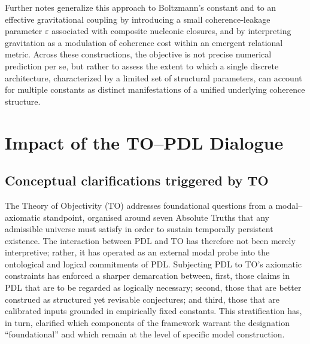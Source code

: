 \documentclass[11pt,a4paper]{article}
\begin{document}
Further notes generalize this approach to Boltzmann’s constant and to an effective gravitational coupling by introducing a small coherence‑leakage parameter $\varepsilon$ associated with composite nucleonic closures, and by interpreting gravitation as a modulation of coherence cost within an emergent relational metric.\cite{Laubscher2026FullPDL,Laubscher2026TopologicalReformulation,Laubscher2026Exponent18} Across these constructions, the objective is not precise numerical prediction per se, but rather to assess the extent to which a single discrete architecture, characterized by a limited set of structural parameters, can account for multiple constants as distinct manifestations of a unified underlying coherence structure.\cite{Laubscher2026FullPDL}

\section{Impact of the TO–PDL Dialogue}

\subsection{Conceptual clarifications triggered by TO}

The Theory of Objectivity (TO) addresses foundational questions from a modal–axiomatic standpoint, organised around seven Absolute Truths that any admissible universe must satisfy in order to sustain temporally persistent existence.\cite{Laubscher2026DialogueTO} The interaction between PDL and TO has therefore not been merely interpretive; rather, it has operated as an external modal probe into the ontological and logical commitments of PDL.\cite{Laubscher2026DialogueTO} Subjecting PDL to TO’s axiomatic constraints has enforced a sharper demarcation between, first, those claims in PDL that are to be regarded as logically necessary; second, those that are better construed as structured yet revisable conjectures; and third, those that are calibrated inputs grounded in empirically fixed constants.\cite{Laubscher2026IntroPDL,Laubscher2026FullPDL} This stratification has, in turn, clarified which components of the framework warrant the designation “foundational” and which remain at the level of specific model construction.
\end{document}
